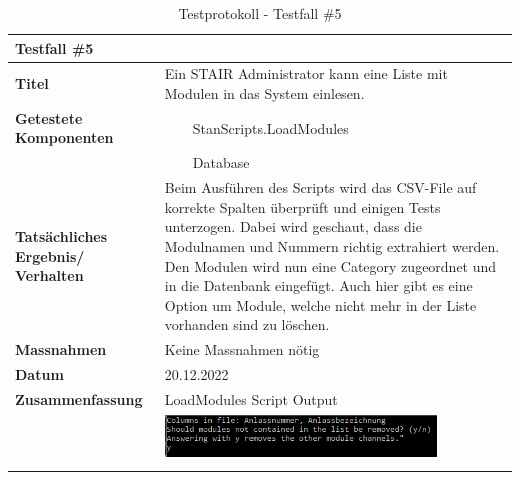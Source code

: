 \documentclass[a4paper, table]{article}
\newcommand{\tabitem}{~~\llap{\textbullet}~~}
\begin{document}
\begin{longtable}[h]{|p{9em}|p{31em}|}
    \hline
    \multicolumn{2}{|l|}{\textbf{Testfall \#5}} \\
    \hline
    \textbf{Titel} & Ein STAIR Administrator kann eine Liste mit Modulen in das System einlesen. \\
    \hline
    \textbf{Getestete Komponenten} &  
        \tabitem StanScripts.LoadModules \\*
     &  \tabitem Database \\
    \hline
    \textbf{Tatsächliches Ergebnis/ Verhalten} &  
        Beim Ausführen des Scripts wird das CSV-File auf korrekte Spalten überprüft und einigen Tests unterzogen. 
        Dabei wird geschaut, dass die Modulnamen und Nummern richtig extrahiert werden. 
        Den Modulen wird nun eine Category zugeordnet und in die Datenbank eingefügt. 
        Auch hier gibt es eine Option um Module, welche nicht mehr in der Liste vorhanden sind zu löschen. \\
    \hline
    \textbf{Massnahmen} & Keine Massnahmen nötig\\
    \hline
    \textbf{Datum} & 20.12.2022\\
    \hline
    \textbf{Zusammenfassung} & LoadModules Script Output \\*
     &  \includegraphics[width=0.8\textwidth]{img/Tests/5_Test_LoadModules.png} \\
    \hline
    \caption{Testprotokoll - Testfall \#5}
\end{longtable}
\end{document}
